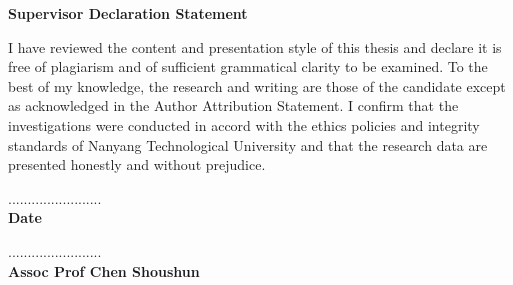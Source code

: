 \begin{center}
	\textbf{\large Supervisor Declaration Statement}
\end{center}


\noindent I have reviewed the content and presentation style of this thesis and declare it is free of plagiarism and of sufficient grammatical clarity to be examined. To the best of my knowledge, the research and writing are those of the candidate except as acknowledged in the Author Attribution Statement. I confirm that the investigations were conducted in accord with the ethics policies and integrity standards of Nanyang Technological University and that the research data are presented honestly and without prejudice.

\vspace{2in}

\begin{multicols}{2}
    \begin{flushleft}
        ........................ \\
        \textbf{Date}
    \end{flushleft}

    \columnbreak

    \begin{flushright}
        ........................ \\
        \textbf{Assoc Prof Chen Shoushun} \\
    \end{flushright}
\end{multicols}
